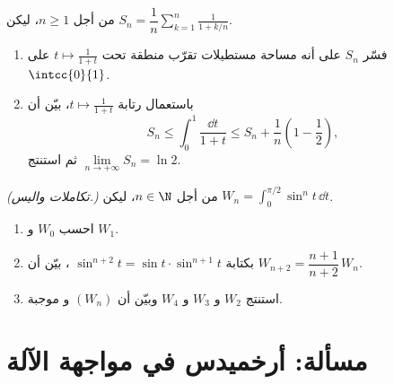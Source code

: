 \begin{exercise}[$\star\star\star$]\label{exo:g12:integ:8}
من أجل $n \geq 1$، ليكن $S_n = \dfrac1n \displaystyle\sum_{k=1}^{n} \frac{1}{1 + k/n}$.
\begin{enumerate}
  \item فسّر $S_n$ على أنه مساحة مستطيلات تقرّب منطقة
        تحت  $t \mapsto \frac{1}{1+t}$ على $\intcc{0}{1}$.
  \item باستعمال رتابة $t \mapsto \frac{1}{1+t}$، بيّن أن
        \[
        S_n \leq \int_0^1 \frac{\dd t}{1+t} \leq S_n + \frac1n\left(1 - \frac12\right),
        \]
        ثم استنتج $\lim\limits_{n\to+\infty} S_n = \ln 2$.
\end{enumerate}
\end{exercise}

\begin{exercise}[$\star\star\star$]\label{exo:g12:integ:9}
\emph{(تكاملات واليس.)} من أجل $n \in \N$، ليكن
$W_n = \displaystyle\int_0^{\pi/2} \sin^n t\,\dd t$.
\begin{enumerate}
  \item احسب $W_0$ و $W_1$.
  \item بكتابة $\sin^{n+2}t = \sin t \cdot \sin^{n+1} t$ ، بيّن أن $W_{n+2} = \dfrac{n+1}{n+2}\,W_n$.
  \item استنتج $W_2$ و $W_3$ و $W_4$ وبيّن أن $(W_n)$  و
        موجبة.
\end{enumerate}
\end{exercise}

\section{مسألة: أرخميدس في مواجهة الآلة}

